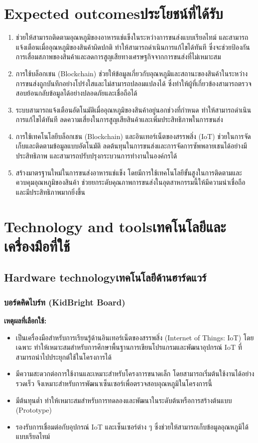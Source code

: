 \section{\ifenglish Expected outcomes\else ประโยชน์ที่ได้รับ\fi}
\sloppy
\begin{enumerate}
    \item ช่วยให้สามารถติดตามอุณหภูมิของอาหารแช่แข็งในระหว่างการขนส่งแบบเรียลไทม์ และสามารถแจ้งเตือนเมื่ออุณหภูมิของสินค้าผิดปกติ ทำให้สามารถดำเนินการแก้ไขได้ทันที ซึ่งจะช่วยป้องกันการเสื่อมสภาพของสินค้าและลดการสูญเสียทางเศรษฐกิจจากการขนส่งที่ไม่เหมาะสม
    \item การใช้บล็อกเชน (Blockchain) ช่วยให้ข้อมูลเกี่ยวกับอุณหภูมิและสถานะของสินค้าในระหว่างการขนส่งถูกบันทึกอย่างโปร่งใสและไม่สามารถปลอมแปลงได้ ซึ่งทำให้ผู้ที่เกี่ยวข้องสามารถตรวจสอบย้อนกลับข้อมูลได้อย่างปลอดภัยและเชื่อถือได้
    \item ระบบสามารถแจ้งเตือนอัตโนมัติเมื่ออุณหภูมิของสินค้าอยู่นอกช่วงที่กำหนด ทำให้สามารถดำเนินการแก้ไขได้ทันที ลดความเสี่ยงในการสูญเสียสินค้าและเพิ่มประสิทธิภาพในการขนส่ง
    \item การใช้เทคโนโลยีบล็อกเชน (Blockchain) และอินเทอร์เน็ตของสรรพสิ่ง (IoT) ช่วยในการจัดเก็บและติดตามข้อมูลแบบอัตโนมัติ ลดต้นทุนในการขนส่งและการจัดการซัพพลายเชนได้อย่างมีประสิทธิภาพ และสามารถปรับปรุงกระบวนการทำงานในองค์กรได้
    \item สร้างมาตรฐานใหม่ในการขนส่งอาหารแช่แข็ง โดยมีการใช้เทคโนโลยีขั้นสูงในการติดตามและควบคุมอุณหภูมิของสินค้า ช่วยยกระดับคุณภาพการขนส่งในอุตสาหกรรมนี้ให้มีความน่าเชื่อถือและมีประสิทธิภาพมากยิ่งขึ้น
\end{enumerate}

\section{\ifenglish Technology and tools\else เทคโนโลยีและเครื่องมือที่ใช้\fi}

\subsection{\ifenglish Hardware technology\else เทคโนโลยีด้านฮาร์ดแวร์\fi}
\subsubsection{บอร์ดคิดไบร์ท (KidBright Board)}
\textbf{เหตุผลที่เลือกใช้:}
\begin{itemize}
    \item เป็นเครื่องมือสำหรับการเรียนรู้ด้านอินเทอร์เน็ตของสรรพสิ่ง (Internet of Things: IoT) โดยเฉพาะ ทำให้เหมาะสมสำหรับการศึกษาพื้นฐานการเขียนโปรแกรมและพัฒนาอุปกรณ์ IoT ที่สามารถนำไปประยุกต์ใช้ในโครงการได้
    \item มีความสะดวกต่อการใช้งานและเหมาะสำหรับโครงการขนาดเล็ก โดยสามารถเริ่มต้นใช้งานได้อย่างรวดเร็ว จึงเหมาะสำหรับการพัฒนาเซ็นเซอร์เพื่อตรวจสอบอุณหภูมิในโครงการนี้
    \item มีต้นทุนต่ำ ทำให้เหมาะสมสำหรับการทดลองและพัฒนาในระดับต้นหรือการสร้างต้นแบบ (Prototype)
    \item รองรับการเชื่อมต่อกับอุปกรณ์ IoT และเซ็นเซอร์ต่าง ๆ ซึ่งช่วยให้สามารถเก็บข้อมูลอุณหภูมิได้แบบเรียลไทม์
\end{itemize}


